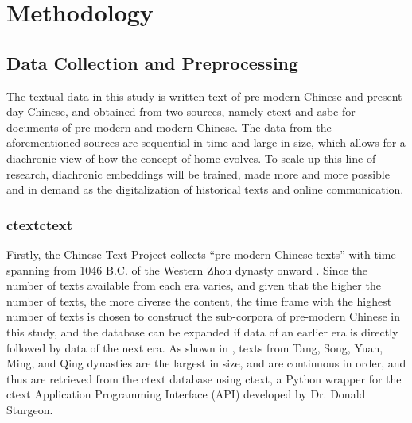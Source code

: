 

\chapter{Methodology}

\section{Data Collection and Preprocessing}
The textual data in this study is written text of pre-modern Chinese and present-day Chinese, and obtained from two sources, namely \gls{ctext} \parencite{sturgeon2019ctext} and \gls{asbc} \parencite{chen1996sinica} for documents of pre-modern and modern Chinese. The data from the aforementioned sources are sequential in time and large in size, which allows for a diachronic view of how the concept of home evolves. To scale up this line of research, diachronic embeddings will be trained, made more and more possible and in demand as the digitalization of historical texts and online communication.

\subsection{\acrlong{ctext}\gls{ctext}}
Firstly, the Chinese Text Project collects ``pre-modern Chinese texts'' with time spanning from 1046 B.C. of the Western Zhou dynasty onward \parencite{sturgeon2019ctext}. Since the number of texts available from each era varies, and given that the higher the number of texts, the more diverse the content, the time frame with the highest number of texts is chosen to construct the sub-corpora of pre-modern Chinese in this study, and the database can be expanded if data of an earlier era is directly followed by data of the next era. As shown in , texts from Tang, Song, Yuan, Ming, and Qing dynasties are the largest in size, and are continuous in order, and thus are retrieved from the \gls{ctext} database using ctext, a Python wrapper for the \gls{ctext} Application Programming Interface (API) developed by Dr. Donald Sturgeon.

